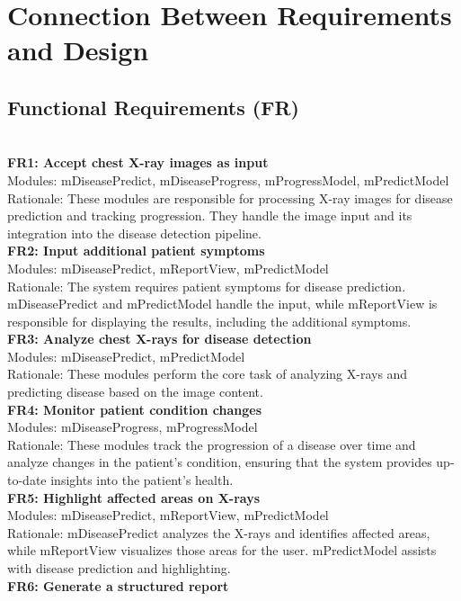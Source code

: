 \documentclass[12pt, titlepage]{article}
\begin{document}
\section{Connection Between Requirements and Design} \label{SecConnection}
\subsection{Functional Requirements (FR)}\\
\textbf{FR1: Accept chest X-ray images as input} \\
Modules: mDiseasePredict, mDiseaseProgress, mProgressModel, mPredictModel \\
Rationale: These modules are responsible for processing X-ray images for disease prediction and tracking progression. They handle the image input and its integration into the disease detection pipeline. \\
\textbf{FR2: Input additional patient symptoms} \\
Modules: mDiseasePredict, mReportView, mPredictModel \\
Rationale: The system requires patient symptoms for disease prediction. mDiseasePredict and mPredictModel handle the input, while mReportView is responsible for displaying the results, including the additional symptoms. \\
\textbf{FR3: Analyze chest X-rays for disease detection} \\
Modules: mDiseasePredict, mPredictModel \\
Rationale: These modules perform the core task of analyzing X-rays and predicting disease based on the image content. \\
\textbf{FR4: Monitor patient condition changes} \\
Modules: mDiseaseProgress, mProgressModel \\
Rationale: These modules track the progression of a disease over time and analyze changes in the patient’s condition, ensuring that the system provides up-to-date insights into the patient's health. \\
\textbf{FR5: Highlight affected areas on X-rays} \\
Modules: mDiseasePredict, mReportView, mPredictModel \\
Rationale: mDiseasePredict analyzes the X-rays and identifies affected areas, while mReportView visualizes those areas for the user. mPredictModel assists with disease prediction and highlighting. \\
\textbf{FR6: Generate a structured report} \\
\end{document}
